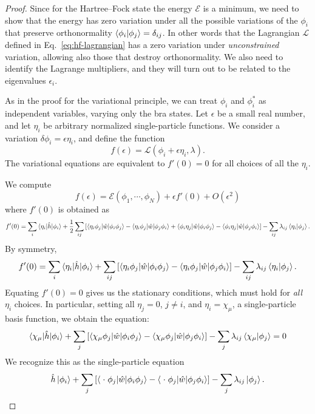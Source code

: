 \documentclass{report}
\theoremstyle{plain}
\theoremstyle{definition}
\begin{document}
\begin{proof}
  Since for the Hartree--Fock state the energy $\mathcal{E}$ is a
  minimum, we need to show that the energy has zero variation under
  all the possible variations of the $\phi_i$ that preserve
  orthonormality $\braket{\phi_i|\phi_j} = \delta_{ij}$. In other
  words that the Lagrangian $\mathcal{L}$ defined in
  Eq.~\eqref{eq:hf-lagrangian} has a zero variation under
  \emph{unconstrained} variation, allowing also those that destroy
  orthonormality. We also need to identify the Lagrange multipliers,
  and they will turn out to be related to the eigenvalues
  $\epsilon_i$.

  As in the proof for the variational principle, we can treat $\phi_i$
  and $\phi_i^*$ as independent variables, varying only the bra
  states. Let $\epsilon$ be a small real number, and let $\eta_i$ be
  arbitrary normalized single-particle functions. We consider a
  variation $\delta\phi_i = \epsilon\eta_i$, and define the
  function
  \begin{equation}
    f(\epsilon) = \mathcal{L}(\phi_i + \epsilon \eta_i, \lambda).
  \end{equation}
  The variational equations are equivalent to $f'(0)=0$ for all
  choices of all the $\eta_i$.

  We compute
  \begin{equation}
    f(\epsilon) = \mathcal{E}(\phi_1,\cdots,\phi_N) + \epsilon
    f'(0) + O(\epsilon^2)
  \end{equation}
  where $f'(0)$ is obtained as
  \begin{equation}
    f'(0) = \sum_i \braket{\eta_i|\hat{h}|\phi_i} +
    \frac{1}{2}\sum_{ij} \left[\braket{\eta_i\phi_j|\hat{w}|\phi_i\phi_j} -
    \braket{\eta_i \phi_j|\hat{w}|\phi_j \phi_i} + \braket{\phi_i
      \eta_j|\hat{w}|\phi_i\phi_j} - 
    \braket{\phi_i \eta_j|\hat{w}|\phi_j \phi_i}\right] -
    \sum_{ij}\lambda_{ij} \braket{\eta_i|\phi_j}. 
  \end{equation}
  By symmetry,
  \begin{equation}
    f'(0) = \sum_i \braket{\eta_i|\hat{h}|\phi_i} + \sum_{ij}\left[
    \braket{\eta_i \phi_j|\hat{w}|\phi_i\phi_j} - \braket{\eta_i\phi_j|\hat{w}|\phi_j \phi_i}\right] -
    \sum_{ij} \lambda_{ij} \braket{\eta_i|\phi_j}.
  \end{equation}
  Equating $f'(0)=0$ gives us the stationary conditions, which must
  hold for \emph{all} $\eta_i$ choices. In particular, setting all
  $\eta_j=0$, $j\neq i$, and $\eta_i=\chi_\mu$, a single-particle
  basis function, we obtain the equation:
  \begin{equation}
    \braket{\chi_\mu|\hat{h}|\phi_i} + \sum_{j}\left[
    \braket{\chi_\mu \phi_j|\hat{w}|\phi_i\phi_j} - \braket{\chi_\mu\phi_j|\hat{w}|\phi_j \phi_i}\right] -
    \sum_{j} \lambda_{ij} \braket{\chi_\mu|\phi_j} = 0
  \end{equation}
  We recognize this as the single-particle equation
  \begin{equation}
    \hat{h}\ket{\phi_i} + \sum_{j}\left[
    \braket{\;\cdot\; \phi_j|\hat{w}|\phi_i\phi_j} - \braket{\;\cdot\;\phi_j|\hat{w}|\phi_j \phi_i}\right] -
    \sum_{j} \lambda_{ij} \ket{\phi_j}.\label{eq:noncan-hf}
  \end{equation}



\end{proof}
\end{document}
